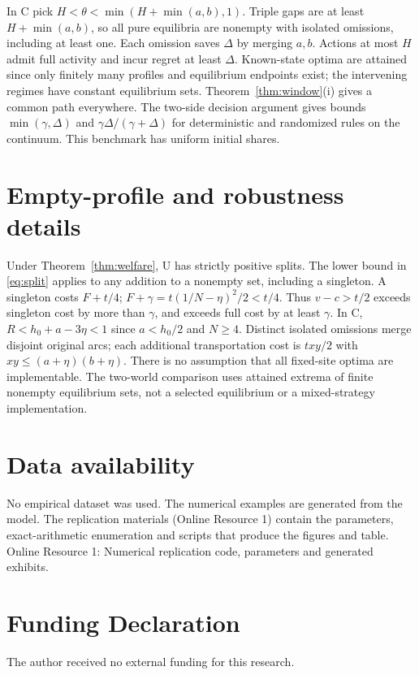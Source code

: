 \documentclass[11pt]{article}
\begin{document}
In C pick $H<\theta<\min(H+\min(a,b),1)$. Triple gaps are at least $H+\min(a,b)$, so all pure equilibria are nonempty with isolated omissions, including at least one. Each omission saves $\Delta$ by merging $a,b$. Actions at most $H$ admit full activity and incur regret at least $\Delta$. Known-state optima are attained since only finitely many profiles and equilibrium endpoints exist; the intervening regimes have constant equilibrium sets. Theorem~\ref{thm:window}(i) gives a common path everywhere. The two-side decision argument gives bounds $\min(\gamma,\Delta)$ and $\gamma\Delta/(\gamma+\Delta)$ for deterministic and randomized rules on the continuum. This benchmark has uniform initial shares.

\section{Empty-profile and robustness details}\label{app:cost}
Under Theorem~\ref{thm:welfare}, U has strictly positive splits. The lower bound in \eqref{eq:split} applies to any addition to a nonempty set, including a singleton. A singleton costs $F+t/4$; $F+\gamma=t(1/N-\eta)^2/2<t/4$. Thus $v-c>t/2$ exceeds singleton cost by more than $\gamma$, and exceeds full cost by at least $\gamma$. In C, $R<h_0+a-3\eta<1$ since $a<h_0/2$ and $N\geq4$. Distinct isolated omissions merge disjoint original arcs; each additional transportation cost is $txy/2$ with $xy\leq(a+\eta)(b+\eta)$. There is no assumption that all fixed-site optima are implementable. The two-world comparison uses attained extrema of finite nonempty equilibrium sets, not a selected equilibrium or a mixed-strategy implementation.

\section*{Data availability}
No empirical dataset was used. The numerical examples are generated from the model. The replication materials (Online Resource 1) contain the parameters, exact-arithmetic enumeration and scripts that produce the figures and table. Online Resource 1: Numerical replication code, parameters and generated exhibits.

\section*{Funding Declaration}
The author received no external funding for this research.
\end{document}

